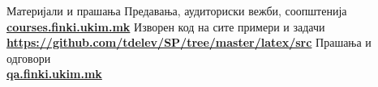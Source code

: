 \begin{frame}{Материјали и прашања}{}
    Предавања, аудиториски вежби, соопштенија\\
    \href{http://courses.finki.ukim.mk/}{\textbf{courses.finki.ukim.mk}}
    \vfill
    Изворен код на сите примери и задачи\\
    \href{https://github.com/tdelev/SP/tree/master/latex/src}{\textbf{https://github.com/tdelev/SP/tree/master/latex/src}}
    \vfill
    Прашања и одговори\\
    \href{http://qa.finki.ukim.mk}{\textbf{qa.finki.ukim.mk}}
\end{frame}
